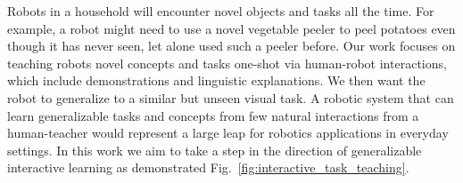 Robots in a household will encounter novel objects and tasks all the time. For example, a robot might need to use a novel vegetable peeler to peel potatoes even though it has never seen, let alone used such a peeler before. Our work focuses on teaching robots novel concepts and tasks one-shot via human-robot interactions,
which include demonstrations and linguistic explanations.
We then want the robot to generalize to a similar but unseen visual task. 
A robotic system that can learn generalizable tasks and concepts from few natural interactions from a human-teacher would represent a large leap for robotics applications in everyday settings. 
In this work we aim to take a step in the direction of generalizable interactive learning as demonstrated Fig.~\ref{fig:interactive_task_teaching}. 

